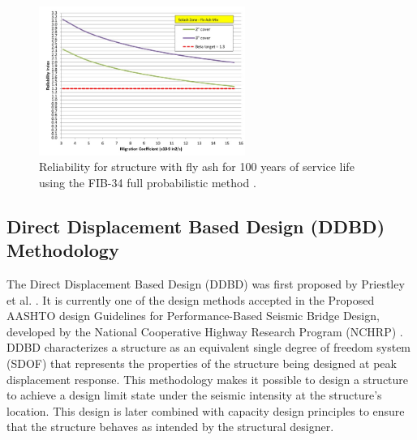 \begin{figure}[htbp]
	\centering
	\includegraphics[width=0.6\textwidth]{VAC Thesis 2.0/Chapter-6/figs/Reliability_shrp_example_2.jpg}
	\caption{Reliability for structure with fly ash for 100 years of service life using the FIB-34 full probabilistic method \cite{SHRP22019}.}
	\label{fig:FIB_34_raliability}
\end{figure}

\subsection{Direct Displacement Based Design (DDBD) Methodology}

The Direct Displacement Based Design (DDBD) was first proposed by Priestley et al. \cite{Priestley2007}. It is currently one of the design methods accepted in the Proposed AASHTO design Guidelines for Performance-Based Seismic Bridge Design, developed by the National Cooperative Highway Research Program (NCHRP) \cite{NCHRP2020}. DDBD characterizes a structure as an equivalent single degree of freedom system (SDOF) that represents the properties of the structure being designed at peak displacement response. This methodology makes it possible to design a structure to achieve a design limit state under the seismic intensity at the structure's location. This design is later combined with capacity design principles to ensure that the structure behaves as intended by the structural designer. 


